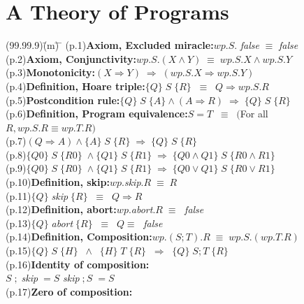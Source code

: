 \documentclass{amsart}
\newcommand{\lgap}{2pt}                             %
\newcommand{\llgap}{6pt}                            %
\newcommand{\equivs}{\ensuremath{\;\equiv\;}}       %
\newcommand{\equivss}{\ensuremath{\;\;\equiv\;\;}}  %
\newcommand{\impl}{\ensuremath{\Rightarrow}}        %
\newcommand{\impls}{\ensuremath{\;\Rightarrow\;}}   %
\begin{document}
\section*{A Theory of Programs}
\begin{tabbing}
(99.99.9)\;\=(m)\;\= \makebox[2in]{ } \= \kill
(p.1)\>\textbf{Axiom, Excluded miracle:}\quad $wp.S.$ \emph{false} $\equiv$\; \emph{false}\\[\lgap]
(p.2)\>\textbf{Axiom, Conjunctivity:}\quad $wp.S.(X\land Y) \equivs wp.S.X \land wp.S.Y$\\[\lgap]
(p.3)\>\textbf{Monotonicity:}\quad $(X\impl Y) \impls (wp.S.X \impl wp.S.Y)$\\[\lgap]
(p.4)\>\textbf{Definition, Hoare triple:}\quad $\{Q\} \; S \; \{R\} \equivss Q \impl wp.S.R$\\[\lgap]
(p.5)\>\textbf{Postcondition rule:}\quad $\{Q\} \; S \; \{A\}\land (A\impl R)\; \impl \;\{Q\} \; S \; \{R\}$\\[\lgap]
(p.6)\>\textbf{Definition, Program equivalence:}\quad $S=T\equivss ($For all $R, wp.S.R\equiv wp.T.R)$\\[\lgap]
(p.7)\>$(Q\impl A)\land \{A\}\; S\; \{R\}\; \impl \; \{Q\}\; S\; \{R\} $\\[\lgap]
(p.8)\>$\{Q0\}\; S\; \{R0\}\;\land \{Q1\}\; S\; \{R1\}\; \impl \; \{Q0 \land Q1\}\; S\; \{R0\land R1\}$\\[\lgap]
(p.9)\>$\{Q0\}\; S\; \{R0\}\;\land \{Q1\}\; S\; \{R1\}\; \impl \; \{Q0 \lor Q1\}\; S\; \{R0\lor R1\}$\\[\llgap]
(p.10)\>\textbf{Definition, skip:}\quad $wp.$\emph{skip}$.R \equivs R$\\[\lgap]
(p.11)\>$\{Q\}\; $\emph{skip}$\; \{R\} \equivss Q\impl R$\\[\lgap]
(p.12)\>\textbf{Definition, abort:}\quad $wp.$\emph{abort}$.R \equivs $ \emph{false}\\[\lgap]
(p.13)\>$\{Q\}\; $\emph{abort}$\; \{R\} \equivss Q\equiv\;$ \emph{false}\\[\lgap]
(p.14)\>\textbf{Definition, Composition:}\quad $wp.(S;T).R \equivs wp.S.(wp.T.R)$\\[\lgap]
(p.15)\>$\{Q\}\;S\;\{H\}\;\;\land\;\; \{H\}\;T\;\{R\} \;\; \impl\;\; \{Q\}\;S;T\;\{R\}$\\[\lgap]
(p.16)\>\textbf{Identity of composition:}\\[\lgap]
       \>$S\;;\;$\emph{skip}$\;=S$ \>\> \emph{skip}$\;;S\;=S$\\[\lgap]
(p.17)\>\textbf{Zero of composition:}\\[\lgap]

\end{tabbing}
\end{document}
